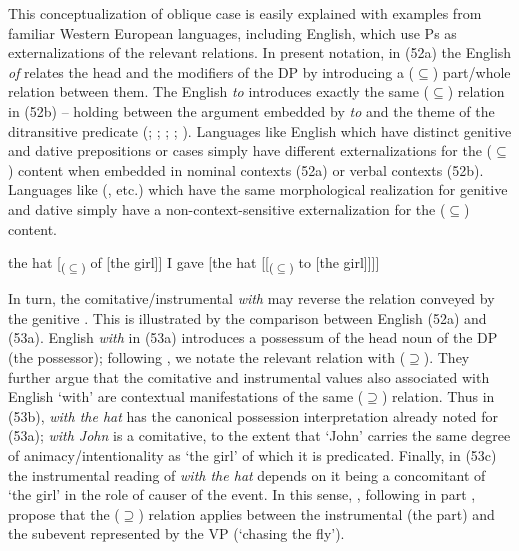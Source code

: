 \documentclass[output=paper]{langsci/langscibook}
\begin{document}
This conceptualization of oblique case is easily explained with examples from familiar Western European languages, including English, which use Ps as externalizations of the relevant relations. In present notation, in (52a) the English  \textit{of} relates the head and the modifiers of the DP by introducing a ($\subseteq$) part\slash whole relation between them. The English  \textit{to} introduces exactly the same ($\subseteq$) relation in (52b) – holding between the argument embedded by \textit{to} and the theme of the ditransitive predicate (\citealt{Kayne1984}; \citealt{Pesetsky1995}; \citealt{Harley2002Possession}; \citealt{Beck2004}; \citealt{Manzini2016}).  Languages like English which have distinct genitive and dative prepositions or cases simply have different externalizations for the ($\subseteq$) content when embedded in nominal contexts (52a) or verbal contexts (52b). Languages like  (, etc.) which have the same morphological realization for genitive and dative simply have a non-context-sensitive externalization for the ($\subseteq$) content.

\ea%
    \label{ex:manzini:52}
    \ea  the hat [\textsubscript{($\subseteq$)} of [the girl]]
    \ex  I gave [the hat [[\textsubscript{($\subseteq$)} to [the girl]]]]
    \z    
\z

In turn, the comitative\slash instrumental  \textit{with} may reverse the relation conveyed by the genitive \citep{Levinson2011}. This is illustrated by the comparison between English (52a) and (53a). English \textit{with} in (53a) introduces a possessum of the head noun of the DP (the possessor); following \citet{Franco2017}, we notate the relevant relation with ($\supseteq$). They further argue that the comitative and instrumental values also associated with English ‘with’ are contextual manifestations of the same ($\supseteq$) relation. Thus in (53b), \textit{with the hat} has the canonical possession interpretation already noted for (53a); \textit{with John} is a comitative, to the extent that ‘John’ carries the same degree of animacy\slash intentionality as ‘the girl’ of which it is predicated. Finally, in (53c) the instrumental reading of \textit{with the hat} depends on it being a concomitant of ‘the girl’ in the role of causer of the event. In this sense, \citet{Franco2017}, following in part \citet{Bruening2012}, propose that the ($\supseteq$) relation applies between the instrumental (the part) and the subevent represented by the VP (‘chasing the fly’).
\end{document}
